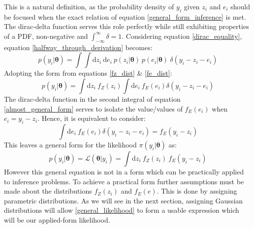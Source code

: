 \begin{tcolorbox}[enhanced jigsaw,breakable,pad at break*=1mm,title=Technical figure 1: General likelihood derivation, title filled,fonttitle=\sffamily\bfseries,fontupper=\sffamily\scriptsize]
\begin{multicols}{2}
This is a natural definition, as the probability density of $y_i$ given $z_i$ and $e_i$ should be focused when the exact relation of equation \ref{general_form_inference} is met. The dirac-delta function serves this role perfectly while still exhibiting properties of a PDF, non-negative and $\int_{-\infty}^{\infty}\delta = 1$. Considering equation \ref{dirac_equality}, equation \ref{halfway_through_derivation} becomes:
\begin{equation}
p(y_i|\bm{\theta}) = \int \int \text{d}z_i\ \text{d}e_i\ p(z_i|\bm{\theta})\ p(e_i|\bm{\theta})\ \delta(y_i-z_i-e_i)
\end{equation}
Adopting the form from equations \ref{fz_dist} \& \ref{fe_dist}:
\begin{equation}
p(y_i|\bm{\theta}) = \int \text{d}z_i\ f_Z(z_i) \int \text{d}e_i\ f_E(e_i) \delta(y_i-z_i-e_i)
\label{almost_general_form}
\end{equation}
The dirac-delta function in the second integral of equation \ref{almost_general_form} serves to isolate the value/values of $f_E(e_i)$ when $e_i = y_i - z_i$. Hence, it is equivalent to consider:
\begin{equation}
\int \text{d}e_i\ f_E(e_i) \delta(y_i-z_i-e_i) = f_E(y_i - z_i)
\end{equation}
This leaves a general form for the likelihood $\pi(y_i|\bm{\theta})$ as: 
\begin{equation}
p(y_i|\bm{\theta}) = \mathcal{L}(\bm{\theta}|y_i) = \int \text{d}z_i\ f_Z(z_i)\ f_E(y_i - z_i)
\label{general_likelihood}
\end{equation}
However this general equation is not in a form which can be practically applied to inference problems. To achieve a practical form further assumptions must be made about the distributions $f_Z(z_i)$ and $f_E(e)$. This is done by assigning parametric distributions. As we will see in the next section, assigning Gaussian distributions will allow \ref{general_likelihood} to form a usable expression which will be our applied-form likelihood.\\
\linebreak
\end{multicols}
\end{tcolorbox}
\newpage

